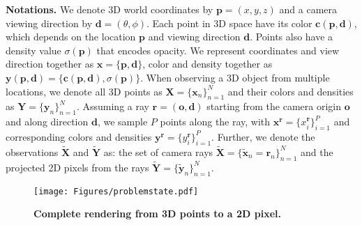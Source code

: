 

\noindent \textbf{Notations.} We denote 3D world coordinates by \(\mathbf{p} = (x, y, z)\) and a camera viewing direction by \(\mathbf{d} = (\theta, \phi)\). Each point in 3D space have its color \(\mathbf{c}(\mathbf{p}, \mathbf{d})\), which depends on the location \(\mathbf{p}\) and viewing direction \(\mathbf{d}\). Points also have a density value \(\sigma(\mathbf{p})\) that encodes opacity. We represent coordinates and view direction together as $\mathbf{x} = \{\mathbf{p},\mathbf{d} \}$, color and density together as \(\mathbf{y}(\mathbf{p}, \mathbf{d}) = \{\mathbf{c}(\mathbf{p}, \mathbf{d}), \sigma(\mathbf{p})\}\).
When observing a 3D object from multiple locations, we denote all 3D points as \(\mathbf{X} = \{\mathbf{x}_n \}_{n=1}^N\) and their colors and densities as \(\mathbf{Y} = \{\mathbf{y}_n\}_{n=1}^N\).
Assuming a ray \(\mathbf{r} = (\mathbf{o}, \mathbf{d})\) starting from the camera origin \(\mathbf{o}\) and along direction \(\mathbf{d}\), we sample $P$ points along the ray, with \(\mathbf{x}^{\mathbf{r}} = \{{x}_i^\mathbf{r}\}_{i=1}^P\) and corresponding colors and densities \(\mathbf{y}^{\mathbf{r}} = \{{y}_i^{\mathbf{r}}\}_{i=1}^P\). Further, we denote the observations \(\widetilde{\mathbf{X}}\) and \(\widetilde{\mathbf{Y}}\) as: the set of camera rays \(\widetilde{\mathbf{X}} = \{\widetilde{\mathbf{x}}_n = \mathbf{r}_n\}_{n=1}^N\) and the projected 2D pixels from the rays \(\widetilde{\mathbf{Y}} = \{\widetilde{\mathbf{y}}_n\}_{n=1}^N\).







\begin{figure}[htbp]
\centering
\centerline{
\texttt{[image: Figures/problemstate.pdf]} 
} 
\caption{\textbf{Complete rendering from 3D points to a 2D pixel.}
}
\label{fig:problem}
\end{figure}

